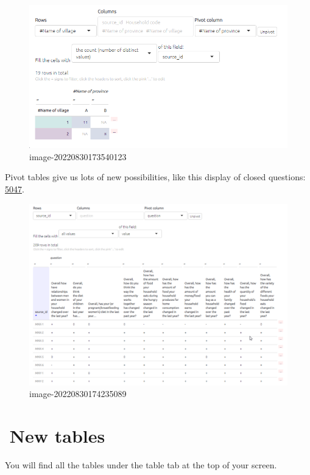 \documentclass[
]{book}
\begin{document}
\begin{figure}
\centering
\includegraphics{_assets/image-20220830173540123.png}
\caption{image-20220830173540123}
\end{figure}

Pivot tables give us lots of new possibilities, like this display of closed questions: \href{https://causalmap.shinyapps.io/tokyo/?s=5047}{5047}.

\begin{figure}
\centering
\includegraphics{_assets/image-20220830174235089.png}
\caption{image-20220830174235089}
\end{figure}

\hypertarget{xall-tables}{%
\chapter{🧪New tables}\label{xall-tables}}

You will find all the tables under the table tab at the top of your screen.
\end{document}

